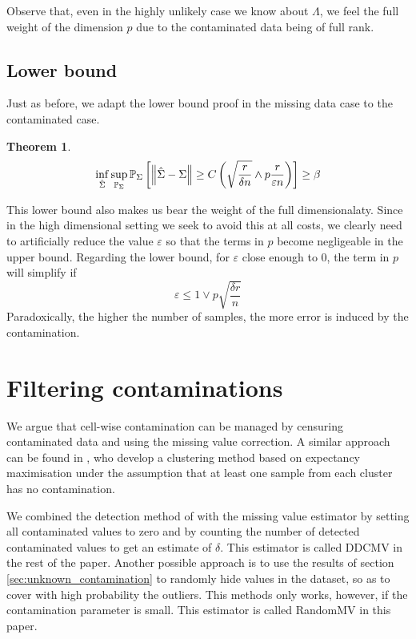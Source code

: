 \documentclass{article}
\numberwithin{equation}{section}
\newtheorem{theorem}{Theorem}
\numberwithin{equation}{section}
\begin{document}
        Observe that, even in the highly unlikely case we know about $\Lambda$, we feel the full weight of the dimension $p$ due to the contaminated data being of full rank. 

    \subsection{Lower bound}

        Just as before, we adapt the lower bound proof in the missing data case to the contaminated case.

        \begin{theorem}
        \begin{equation}
            \begin{split}
            \inf_{\hat{\Sigma}} \sup_{\mathbb{P}_\Sigma} \mathbb{P}_\Sigma \left[ \left\Vert \hat{\Sigma} - \Sigma \right\Vert \geq C \left( \sqrt{\frac{r}{\delta n}} \land p \frac{r}{\varepsilon n}\right) \right] \geq \beta
            \end{split}
        \end{equation}
    \end{theorem}

    This lower bound also makes us bear the weight of the full dimensionalaty. Since in the high dimensional setting we seek to avoid this at all costs, we clearly need to artificially reduce the value $\varepsilon$ so that the terms in $p$ become negligeable in the upper bound. Regarding the lower bound, for $\varepsilon$ close enough to $0$, the term in $p$ will simplify if
    \begin{equation}
        \varepsilon \leq 1 \lor p \sqrt{\frac{\delta r}{n}}
    \end{equation}
    Paradoxically, the higher the number of samples, the more error is induced by the contamination.

\section{Filtering contaminations}

    We argue that cell-wise contamination can be managed by censuring contaminated data and using the missing value correction. A similar approach can be found in \cite{farcomeniRobustConstrainedClustering2014}, who develop a clustering method based on expectancy maximisation under the assumption that at least one sample from each cluster has no contamination.
    
    We combined the detection method of \cite{rousseeuwDetectingDeviatingData2018} with the missing value estimator by setting all contaminated values to zero and by counting the number of detected contaminated values to get an estimate of $\delta$. This estimator is called DDCMV in the rest of the paper. Another possible approach is to use the results of section \ref{sec:unknown_contamination} to randomly hide values in the dataset, so as to cover with high probability the outliers. This methods only works, however, if the contamination parameter is small. This estimator is called RandomMV in this paper.
\end{document}
